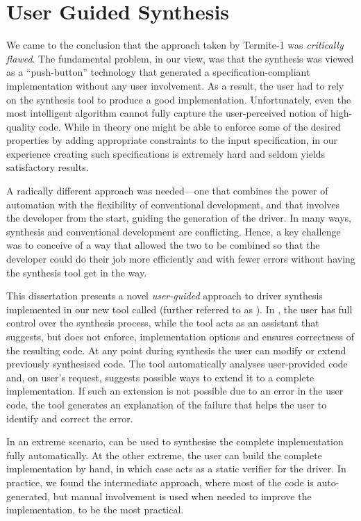 \section{User Guided Synthesis}

We came to the conclusion that the approach taken by Termite-1 was \emph{critically flawed}.  The fundamental problem, in our view, was that the synthesis was viewed as a ``push-button'' technology that generated a specification-compliant implementation without any user involvement.  As a result, the user had to rely on the synthesis tool to produce a good implementation.  Unfortunately, even the most intelligent algorithm cannot fully capture the user-perceived notion of high-quality code.  While in theory one might be able to enforce some of the desired properties by adding appropriate constraints to the input specification, in our experience creating such specifications is extremely hard and seldom yields satisfactory results.

A radically different approach was needed---one that combines the power of automation with the flexibility of conventional development, and that involves the developer from the start, guiding the generation of the driver.  In many ways, synthesis and conventional development are conflicting.  Hence, a key challenge was to conceive of a way that allowed the two to be combined so that the developer could do their job more efficiently and with fewer errors without having the synthesis tool get in the way.

This dissertation presents a novel \emph{user-guided} approach to driver synthesis implemented in our new tool called  (further referred to as \termite).  In \termite, the user has full control over the synthesis process, while the tool acts as an assistant that suggests, but does not enforce, implementation options and ensures correctness of the resulting code.  At any point during synthesis the user can modify or extend previously synthesised code.  The tool automatically analyses user-provided code and, on user's request, suggests possible ways to extend it to a complete implementation.  If such an extension is not possible due to an error in the user code, the tool generates an explanation of the failure that helps the user to identify and correct the error.

In an extreme scenario, \termite can be used to synthesise the complete implementation fully automatically.  At the other extreme, the user can build the complete implementation by hand, in which case \termite acts as a static verifier for the driver.  In practice, we found the intermediate approach, where most of the code is auto-generated, but manual involvement is used when needed to improve the implementation, to be the most practical.

